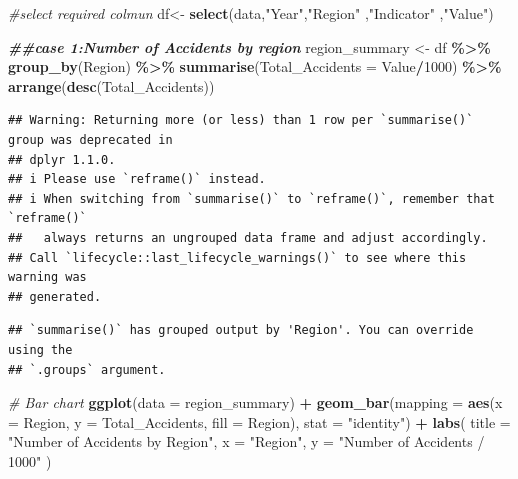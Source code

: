 \documentclass[
]{article}
\newenvironment{Shaded}{\begin{snugshade}}{\end{snugshade}}
\newcommand{\AttributeTok}[1]{\textcolor[rgb]{0.13,0.29,0.53}{#1}}
\newcommand{\CommentTok}[1]{\textcolor[rgb]{0.56,0.35,0.01}{\textit{#1}}}
\newcommand{\DecValTok}[1]{\textcolor[rgb]{0.00,0.00,0.81}{#1}}
\newcommand{\DocumentationTok}[1]{\textcolor[rgb]{0.56,0.35,0.01}{\textbf{\textit{#1}}}}
\newcommand{\FunctionTok}[1]{\textcolor[rgb]{0.13,0.29,0.53}{\textbf{#1}}}
\newcommand{\NormalTok}[1]{#1}
\newcommand{\OtherTok}[1]{\textcolor[rgb]{0.56,0.35,0.01}{#1}}
\newcommand{\SpecialCharTok}[1]{\textcolor[rgb]{0.81,0.36,0.00}{\textbf{#1}}}
\newcommand{\StringTok}[1]{\textcolor[rgb]{0.31,0.60,0.02}{#1}}
\begin{document}
\begin{Shaded}
\begin{Highlighting}[]
\CommentTok{\#select  required colmun}
\NormalTok{df}\OtherTok{\textless{}{-}} \FunctionTok{select}\NormalTok{(data,}\StringTok{"Year"}\NormalTok{,}\StringTok{"Region"}\NormalTok{ ,}\StringTok{"Indicator"}\NormalTok{ ,}\StringTok{"Value"}\NormalTok{)}


\DocumentationTok{\#\#case 1:Number of Accidents by region }
\NormalTok{region\_summary }\OtherTok{\textless{}{-}}\NormalTok{ df }\SpecialCharTok{\%\textgreater{}\%}
  \FunctionTok{group\_by}\NormalTok{(Region) }\SpecialCharTok{\%\textgreater{}\%}
  \FunctionTok{summarise}\NormalTok{(}\AttributeTok{Total\_Accidents =}\NormalTok{ Value}\SpecialCharTok{/}\DecValTok{1000}\NormalTok{) }\SpecialCharTok{\%\textgreater{}\%}
  \FunctionTok{arrange}\NormalTok{(}\FunctionTok{desc}\NormalTok{(Total\_Accidents))}
\end{Highlighting}
\end{Shaded}

\begin{verbatim}
## Warning: Returning more (or less) than 1 row per `summarise()` group was deprecated in
## dplyr 1.1.0.
## i Please use `reframe()` instead.
## i When switching from `summarise()` to `reframe()`, remember that `reframe()`
##   always returns an ungrouped data frame and adjust accordingly.
## Call `lifecycle::last_lifecycle_warnings()` to see where this warning was
## generated.
\end{verbatim}

\begin{verbatim}
## `summarise()` has grouped output by 'Region'. You can override using the
## `.groups` argument.
\end{verbatim}

\begin{Shaded}
\begin{Highlighting}[]
\CommentTok{\# Bar chart}
\FunctionTok{ggplot}\NormalTok{(}\AttributeTok{data =}\NormalTok{ region\_summary) }\SpecialCharTok{+} \FunctionTok{geom\_bar}\NormalTok{(}\AttributeTok{mapping =} \FunctionTok{aes}\NormalTok{(}\AttributeTok{x =}\NormalTok{ Region, }\AttributeTok{y =}\NormalTok{ Total\_Accidents, }\AttributeTok{fill =}\NormalTok{ Region), }\AttributeTok{stat =} \StringTok{"identity"}\NormalTok{) }\SpecialCharTok{+}
  \FunctionTok{labs}\NormalTok{( }\AttributeTok{title =} \StringTok{"Number of Accidents by Region"}\NormalTok{, }\AttributeTok{x =} \StringTok{"Region"}\NormalTok{, }\AttributeTok{y =} \StringTok{"Number of Accidents / 1000"}\NormalTok{ )}
\end{Highlighting}
\end{Shaded}
\end{document}
